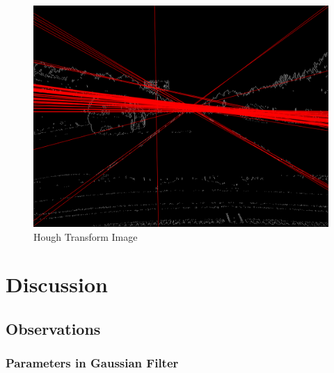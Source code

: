 \documentclass[12pt,a4paper]{report}
\begin{document}
\begin{figure}[!htb]
  \centering
  \includegraphics[height=0.4\paperheight]{result_img/img2_q3.png}
  \caption{Hough Transform Image}
\end{figure}
\clearpage



\chapter{Discussion}
\section{Observations}
\subsection{Parameters in Gaussian Filter}
\end{document}

